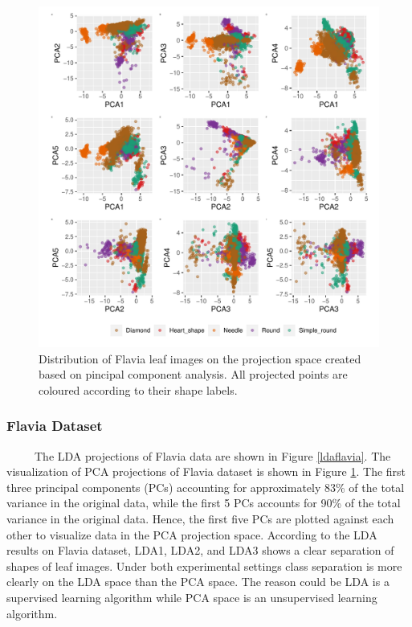 \documentclass{article}
\begin{document}
\begin{figure}
\centering
\includegraphics{img/pcaflavia-1.pdf}
\caption{\label{pcaflavia}Distribution of Flavia leaf images on the
projection space created based on pincipal component analysis. All
projected points are coloured according to their shape labels.}
\end{figure}

\hypertarget{flavia-dataset}{%
\subsubsection{Flavia Dataset}\label{flavia-dataset}}

~~~~~The LDA projections of Flavia data are shown in Figure
\ref{ldaflavia}. The visualization of PCA projections of Flavia dataset
is shown in Figure \ref{pcaflavia}. The first three principal components
(PCs) accounting for approximately 83\% of the total variance in the
original data, while the first 5 PCs accounts for 90\% of the total
variance in the original data. Hence, the first five PCs are plotted
against each other to visualize data in the PCA projection space.
According to the LDA results on Flavia dataset, LDA1, LDA2, and LDA3
shows a clear separation of shapes of leaf images. Under both
experimental settings class separation is more clearly on the LDA space
than the PCA space. The reason could be LDA is a supervised learning
algorithm while PCA space is an unsupervised learning algorithm.
\end{document}
